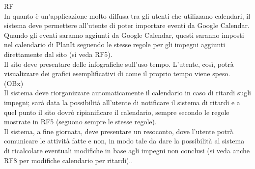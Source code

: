 \begin {listaPersonale}{RF}
 \\
In quanto è un'applicazione molto diffusa tra gli utenti che utilizzano calendari, il sistema deve permettere all'utente di poter importare eventi da Google Calendar. Quando gli eventi saranno aggiunti da Google Calendar, questi saranno imposti nel calendario di PlanIt seguendo le stesse regole per gli impegni aggiunti direttamente dal sito (si veda RF5).
 \\
Il sito deve presentare delle infografiche sull'uso tempo. L'utente, così, potrà visualizzare dei grafici esemplificativi di come il proprio tempo viene speso. (OBx)
 \\
Il sistema deve riorganizzare automaticamente il calendario in caso di ritardi sugli impegni; sarà data la possibilità all'utente di notificare il sistema di ritardi e a quel punto il sito dovrò ripianificare il calendario, sempre secondo le regole mostrate in RF5 (seguono sempre le stesse regole).
 \\
Il sistema, a fine giornata, deve presentare un resoconto, dove l'utente potrà comunicare le attività fatte e non, in modo tale da dare la possibilità al sistema di ricalcolare eventuali modifiche in base agli impegni non conclusi (si veda anche RF8 per modifiche calendario per ritardi)..

\end{listaPersonale}